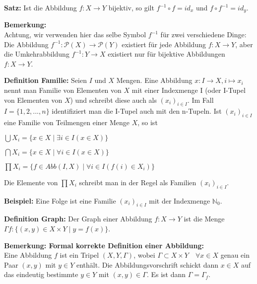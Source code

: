 \documentclass[11pt]{article}
\begin{document}
			\begin{framed}
				\textbf{Satz:} Ist die Abbildung $f: X \to Y$ bijektiv, so gilt $f^{-1} \circ f = id_x$ und
				$f \circ f^{-1} = id_y$.
			\end{framed}
			
			\textbf{Bemerkung:} \\
			Achtung, wir verwenden hier das selbe Symbol $f^{-1}$ f\"ur zwei verschiedene Dinge: Die Abbildung
			$f^{-1}: \mathcal P(X) \to \mathcal P(Y)$ existiert f\"ur jede Abbildung $f: X \to Y$, aber die
			Umkehrabbildung $f^{-1}: Y \to X$ existiert nur f\"ur bijektive Abbildungen $f: X \to Y$. \\
			
			\begin{mdframed}[backgroundcolor=blue!20]
				\textbf{Definition Familie:} Seien $I$ und $X$ Mengen. Eine Abbildung $x: I \to X, i \mapsto
				x_i$ nennt man Familie von Elementen von $X$ mit einer Indexmenge I (oder I-Tupel von 
				Elementen von $X$) und schreibt diese auch als $(x_i)_{i \in I}$. Im Fall $I=\{1,2,...,n\}$
				identifiziert man die I-Tupel auch mit den n-Tupeln. Ist $(x_i)_{i \in I}$ eine Familie von
				Teilmengen einer Menge $X$, so ist 
				\begin{compactitem}
					\item $\bigcup X_i = \{x \in X \mid \exists i \in I(x \in X)\}$
					\item $\bigcap X_i = \{x \in X \mid \forall i \in I(x \in X)\}$
					\item $\prod X_i = \{f \in Abb(I,X) \mid \forall i \in I(f(i) \in X_i)\}$
				\end{compactitem}
				Die Elemente von $\prod X_i$ schreibt man in der Regel als Familien $(x_i)_{i \in I}$.
			\end{mdframed}
			
			\textbf{Beispiel: } Eine Folge ist eine Familie $(x_i)_{i \in I}$ mit der Indexmenge $\mathbb N_0$.
			
			\begin{mdframed}[backgroundcolor=blue!20]
				\textbf{Definition Graph:} Der Graph einer Abbildung $f: X \to Y$ ist die Menge $\Gamma f: 
				\{(x,y) \in X \times Y \mid y=f(x)\}$.
			\end{mdframed}
			
			\textbf{Bemerkung: Formal korrekte Definition einer Abbildung:} \\
			Eine Abbildung $f$ ist ein Tripel $(X,Y,\Gamma)$, wobei $\Gamma \subset X \times Y \quad \forall
			x \in X$ genau ein Paar $(x,y)$ mit $y \in Y$ enth\"alt. Die Abbildungsvorschrift schickt dann
			$x \in X$ auf das eindeutig bestimmte $y \in Y$ mit $(x,y) \in \Gamma$. Es ist dann $\Gamma =
			\Gamma_f$.
			
\end{document}
